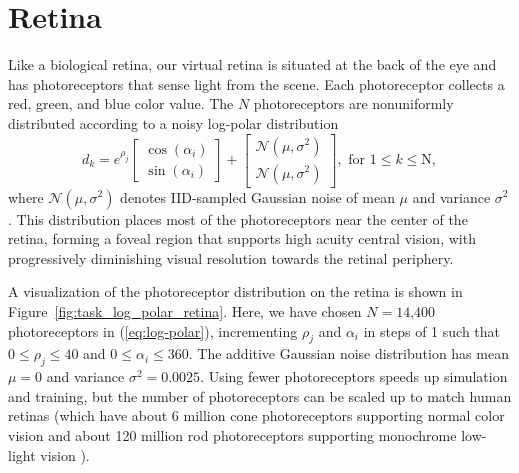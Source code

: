 \documentclass [MS] {UCLAthesis}
\begin{document}

\section{Retina}

Like a biological retina, our virtual retina is situated at the back of the eye and has photoreceptors that sense light from the scene. Each photoreceptor collects a red, green, and blue color value. The $N$ photoreceptors are nonuniformly distributed according to a noisy log-polar distribution
\begin{equation}
d_k = e^{\rho_j} 
    \begin{bmatrix} 
        \cos( \alpha_i) \\ 
        \sin( \alpha_i) 
    \end{bmatrix}
    +
    \begin{bmatrix} 
        \mathcal{N}(\mu, \sigma^2) \\ 
        \mathcal{N}(\mu, \sigma^2)
    \end{bmatrix},
    \text{ for }
    1 \leq k \leq \text{N},
    \label{eq:log-polar}
\end{equation}
where $\mathcal N(\mu, \sigma^2)$ denotes IID-sampled Gaussian noise of mean $\mu$ and variance $\sigma^2$. This distribution places most of the photoreceptors near the center of the retina, forming a foveal region that supports high acuity central vision, with progressively diminishing visual resolution towards the retinal periphery.


A visualization of the photoreceptor distribution on the retina is shown in Figure~\ref{fig:task_log_polar_retina}. Here, we have chosen $N=\text{14,400}$ photoreceptors in (\ref{eq:log-polar}), incrementing $\rho_j$ and $\alpha_i$ in steps of 1 such that $0 \leq \rho_j \leq 40$ and $0 \leq \alpha_i \leq 360$. The additive Gaussian noise distribution has mean $\mu = 0$ and variance $\sigma^2 = 0.0025$.  Using fewer photoreceptors speeds up simulation and training, but the number of photoreceptors can be scaled up to match human retinas (which have about 6 million cone photoreceptors supporting normal color vision and about 120 million rod photoreceptors supporting monochrome low-light vision \citep{rodsAndCones}).
\end{document}
